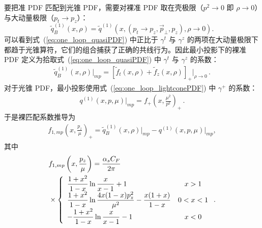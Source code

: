 要把准 PDF 匹配到光锥 PDF，需要对裸准 PDF 取在壳极限（$p^2\to 0$ 即 $\rho\to0$）与大动量极限（$p_t\to p_z$）：
\begin{equation}
\widetilde{q}^{(1)}_B(x,\rho)=\widetilde{q}^{(1)}(x,(p_t\to p_z,\vec{p}_\perp,p_z),\rho\to 0).
\end{equation}
可以看到式~(\ref{eq:one_loop_quasiPDF}) 中正比于 $\gamma^t$ 与 $\gamma^z$ 的两项在大动量极限下都趋于光锥算符，它们的组合捕获了正确的共线行为。因此最小投影下的裸准 PDF 定义为拾取式~(\ref{eq:one_loop_quasiPDF}) 中 $\gamma^t$ 与 $\gamma^z$ 的系数：
\begin{align}
\widetilde{q}_B^{(1)}(x,\rho)\Big|_{mp}=\left[\widetilde{f}_t(x,\rho)+\widetilde{f}_z(x,\rho)\right]_+\bigg|_{\rho\to 0}\,.
\end{align}
对于光锥 PDF，最小投影使用式~(\ref{eq:one_loop_lightconePDF}) 中 $\gamma^+$ 的系数：
\begin{align}
q^{(1)}(x,p,\mu)\Big|_{mp}= f_+\left(x,\frac{\mu^2}{p^2}\right)_+\,.
\end{align}
于是裸匹配系数推导为
\begin{align} \label{eq:mpbarematching}
f_{1,mp}\left(x,\frac{p_z}{\mu}\right)_+= \widetilde{q}^{(1)}_B(x,\rho)\Big|_{mp}-q^{(1)}(x,p,\mu)\bigg|_{mp},
\end{align}
其中
\begin{align}
&f_{1,mp}\left(x,\frac{p_z}{\mu}\right)=\frac{\alpha_s C_F}{2\pi} \nonumber\\
&\times \left\{
\begin{array}{lc}
\displaystyle \frac{1+x^2}{1-x}\ln\frac{x}{x-1}+1 & x>1\\
\displaystyle \frac{1+x^2}{1-x}\ln\frac{4x(1-x)p_z^2}{\mu^2}-\frac{x(1+x)}{1-x} & 0<x<1\\
\displaystyle -\frac{1+x^2}{1-x}\ln\frac{x}{x-1}-1 & x<0
\end{array} \right. .
\end{align}

